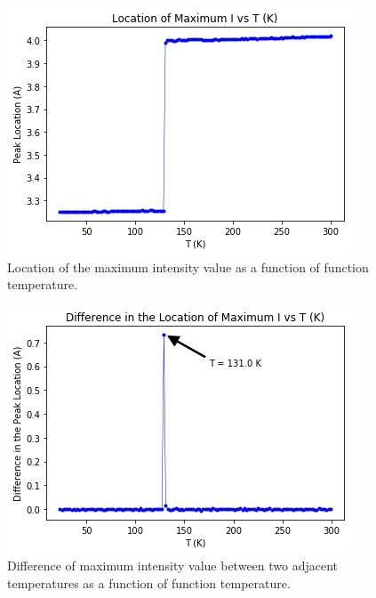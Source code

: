\begin{figure}[h]
  \centering
  \includegraphics[scale=0.25]{../poster/figs/dsmax.png}
  \caption{Location of the maximum intensity value as a function of function temperature.}
  \label{fig:loc}
\end{figure}

\begin{figure}[h]
  \centering
  \includegraphics[scale=0.25]{../figs/dsdiff_T.png}
  \caption{Difference of maximum intensity value between two adjacent temperatures as a function of function temperature.}
  \label{fig:locdiff}
\end{figure}